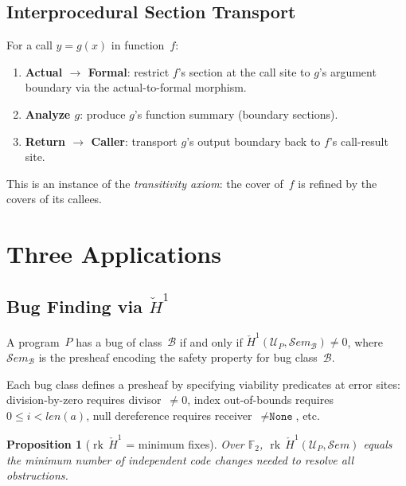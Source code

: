 \documentclass[acmsmall,screen,review,anonymous]{acmart}
\newtheorem{proposition}[theorem]{Proposition}
\theoremstyle{remark}
\newcommand{\Sem}{\mathcal{S}\mathit{em}}
\newcommand{\Hc}[1]{\check{H}^{#1}}
\newcommand{\rk}{\operatorname{rk}}
\newcommand{\GF}{\mathbb{F}}
\begin{document}
\subsection{Interprocedural Section Transport}\label{sec:interprocedural}

For a call $y = g(x)$ in function~$f$:
\begin{enumerate}[nosep]
  \item \textbf{Actual $\to$ Formal}: restrict $f$'s section at the call
    site to $g$'s argument boundary via the actual-to-formal morphism.
  \item \textbf{Analyze $g$}: produce $g$'s function summary (boundary
    sections).
  \item \textbf{Return $\to$ Caller}: transport $g$'s output boundary
    back to $f$'s call-result site.
\end{enumerate}
This is an instance of the \emph{transitivity axiom}: the cover of~$f$
is refined by the covers of its callees.

\section{Three Applications}\label{sec:applications}

\subsection{Bug Finding via $\Hc{1}$}\label{sec:bugs}

\begin{theorem}\label{thm:bugs}
A program~$P$ has a bug of class~$\mathcal{B}$ if and only if
$\Hc{1}(\mathcal{U}_P, \Sem_{\mathcal{B}}) \neq 0$, where
$\Sem_{\mathcal{B}}$ is the presheaf encoding the safety property
for bug class~$\mathcal{B}$.
\end{theorem}

Each bug class defines a presheaf by specifying viability predicates at
error sites: division-by-zero requires divisor~$\neq 0$, index
out-of-bounds requires $0 \leq i < \mathit{len}(a)$, null dereference
requires receiver~$\neq \texttt{None}$, etc.

\begin{proposition}[$\rk\,\Hc{1}$ = minimum fixes]\label{prop:rank-h1}
Over $\GF_2$, $\rk\,\Hc{1}(\mathcal{U}_P, \Sem)$ equals the minimum
number of independent code changes needed to resolve all obstructions.
\end{proposition}
\end{document}
